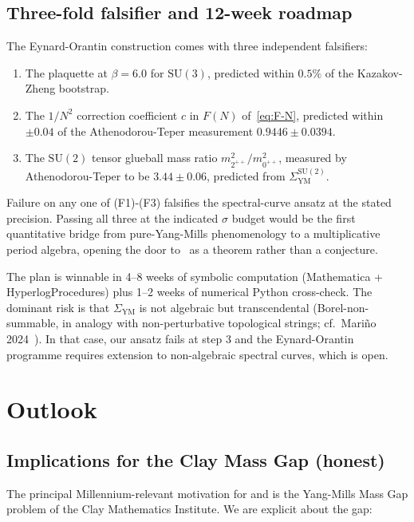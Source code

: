 \documentclass[11pt]{amsart}
\theoremstyle{definition}
\theoremstyle{remark}
\begin{document}
\subsection{Three-fold falsifier and 12-week roadmap}\label{ss:falsifier}
The Eynard-Orantin construction comes with three independent
falsifiers:

\begin{enumerate}
\item[\textup{(F1)}] The plaquette at $\beta = 6.0$ for $\mathrm{SU}(3)$,
predicted within $0.5\%$ of the Kazakov-Zheng bootstrap.
\item[\textup{(F2)}] The $1/N^2$ correction coefficient $c$ in
$F(N)$ of~\eqref{eq:F-N}, predicted within $\pm 0.04$ of the
Athenodorou-Teper measurement $0.9446 \pm 0.0394$.
\item[\textup{(F3)}] The $\mathrm{SU}(2)$ tensor glueball mass ratio
$m_{2^{++}}^2 / m_{0^{++}}^2$, measured by Athenodorou-Teper to be
$3.44 \pm 0.06$, predicted from $\Sigma_{\mathrm{YM}}^{\mathrm{SU}(2)}$.
\end{enumerate}

Failure on any one of (F1)-(F3) falsifies the spectral-curve ansatz
at the stated precision. Passing all three at the indicated $\sigma$
budget would be the first quantitative bridge from pure-Yang-Mills
phenomenology to a multiplicative period algebra, opening the door
to~ as a theorem rather than a conjecture.

The plan is winnable in 4--8 weeks of symbolic computation
(Mathematica + HyperlogProcedures) plus 1--2 weeks of numerical
Python cross-check. The dominant risk is that
$\Sigma_{\mathrm{YM}}$ is not algebraic but transcendental
(Borel-non-summable, in analogy with non-perturbative topological
strings; cf.\ Mari\~no 2024~\cite{Marino2024}). In that case, our
ansatz fails at step 3 and the Eynard-Orantin programme requires
extension to non-algebraic spectral curves, which is open.

\section{Outlook}\label{sec:outlook}

\subsection{Implications for the Clay Mass Gap (honest)}
The principal Millennium-relevant motivation for  and
 is the Yang-Mills Mass Gap problem of the Clay
Mathematics Institute. We are explicit about the gap:
\end{document}
